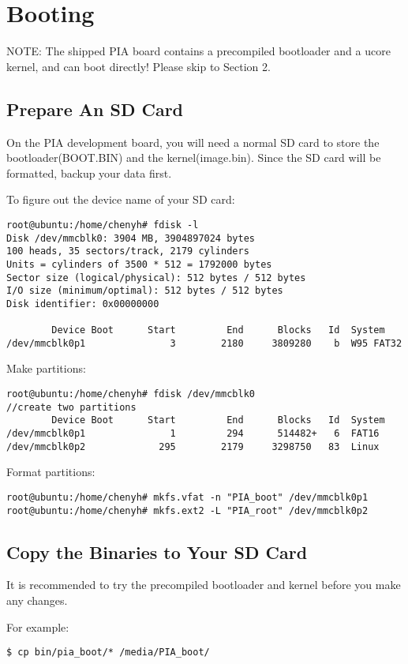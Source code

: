 \documentclass[a4paper]{article}
\begin{document}
\section{Booting}
NOTE: The shipped PIA board contains a precompiled bootloader and a 
ucore kernel, and can boot directly! Please skip to Section 2.
\subsection{Prepare An SD Card}

On the PIA development board, you will need a normal SD card to store
the bootloader(BOOT.BIN) and the kernel(image.bin).
Since the SD card will be formatted, backup your data first.

To figure out the device name of your SD card:
\begin{verbatim}
root@ubuntu:/home/chenyh# fdisk -l
Disk /dev/mmcblk0: 3904 MB, 3904897024 bytes
100 heads, 35 sectors/track, 2179 cylinders
Units = cylinders of 3500 * 512 = 1792000 bytes
Sector size (logical/physical): 512 bytes / 512 bytes
I/O size (minimum/optimal): 512 bytes / 512 bytes
Disk identifier: 0x00000000

        Device Boot      Start         End      Blocks   Id  System
/dev/mmcblk0p1               3        2180     3809280    b  W95 FAT32
\end{verbatim}

Make partitions:
\begin{verbatim}
root@ubuntu:/home/chenyh# fdisk /dev/mmcblk0
//create two partitions
        Device Boot      Start         End      Blocks   Id  System
/dev/mmcblk0p1               1         294      514482+   6  FAT16
/dev/mmcblk0p2             295        2179     3298750   83  Linux
\end{verbatim}

Format partitions:
\begin{verbatim}
root@ubuntu:/home/chenyh# mkfs.vfat -n "PIA_boot" /dev/mmcblk0p1
root@ubuntu:/home/chenyh# mkfs.ext2 -L "PIA_root" /dev/mmcblk0p2
\end{verbatim}

\subsection{Copy the Binaries to Your SD Card}
It is recommended to try the precompiled bootloader and kernel before
you make any changes.

For example:
\begin{verbatim}
$ cp bin/pia_boot/* /media/PIA_boot/
\end{verbatim}
\end{document}
